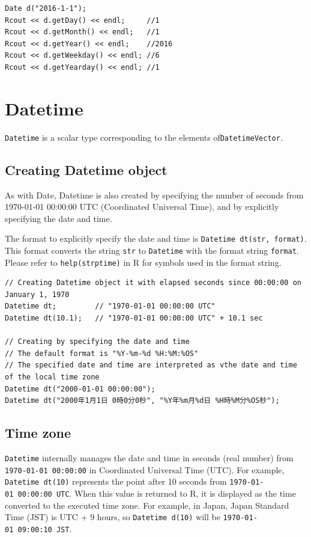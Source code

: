 \documentclass[
]{book}
\begin{document}
\begin{verbatim}
Date d("2016-1-1");
Rcout << d.getDay() << endl;     //1
Rcout << d.getMonth() << endl;   //1
Rcout << d.getYear() << endl;    //2016
Rcout << d.getWeekday() << endl; //6
Rcout << d.getYearday() << endl; //1
\end{verbatim}

\hypertarget{datetime}{%
\chapter{Datetime}\label{datetime}}

\texttt{Datetime} is a scalar type corresponding to the elements of\texttt{DatetimeVector}.

\hypertarget{creating-datetime-object}{%
\section{Creating Datetime object}\label{creating-datetime-object}}

As with Date, Datetime is also created by specifying the number of seconds from 1970-01-01 00:00:00 UTC (Coordinated Universal Time), and by explicitly specifying the date and time.

The format to explicitly specify the date and time is \texttt{Datetime\ dt(str,\ format)}. This format converts the string \texttt{str} to \texttt{Datetime} with the format string \texttt{format}. Please refer to \texttt{help(strptime)} in R for symbols used in the format string.

\begin{verbatim}
// Creating Datetime object it with elapsed seconds since 00:00:00 on January 1, 1970
Datetime dt;         // "1970-01-01 00:00:00 UTC"
Datetime dt(10.1);   // "1970-01-01 00:00:00 UTC" + 10.1 sec

// Creating by specifying the date and time
// The default format is "%Y-%m-%d %H:%M:%OS"
// The specified date and time are interpreted as vthe date and time of the local time zone
Datetime dt("2000-01-01 00:00:00");
Datetime dt("2000年1月1日 0時0分0秒", "%Y年%m月%d日 %H時%M分%OS秒");
\end{verbatim}

\hypertarget{time-zone}{%
\section{Time zone}\label{time-zone}}

\texttt{Datetime} internally manages the date and time in seconds (real number) from \texttt{1970-01-01\ 00:00:00} in Coordinated Universal Time (UTC). For example, \texttt{Datetime\ dt(10)} represents the point after 10 seconds from \texttt{1970-01-01\ 00:00:00\ UTC}. When this value is returned to R, it is displayed as the time converted to the executed time zone. For example, in Japan, Japan Standard Time (JST) is UTC + 9 hours, so \texttt{Datetime\ d(10)} will be \texttt{1970-01-01\ 09:00:10\ JST}.
\end{document}
